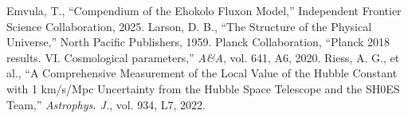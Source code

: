 \documentclass[11pt]{article}
\begin{document}
\begin{thebibliography}{9}
\raggedright
{} Emvula, T., ``Compendium of the Ehokolo Fluxon Model,'' Independent Frontier Science Collaboration, 2025.
 Larson, D. B., ``The Structure of the Physical Universe,'' North Pacific Publishers, 1959.
 Planck Collaboration, ``Planck 2018 results. VI. Cosmological parameters,'' \textit{A\&A}, vol. 641, A6, 2020.
 Riess, A. G., et al., ``A Comprehensive Measurement of the Local Value of the Hubble Constant with 1 km/s/Mpc Uncertainty from the Hubble Space Telescope and the SH0ES Team,'' \textit{Astrophys. J.}, vol. 934, L7, 2022.
\end{thebibliography}
\end{document}

